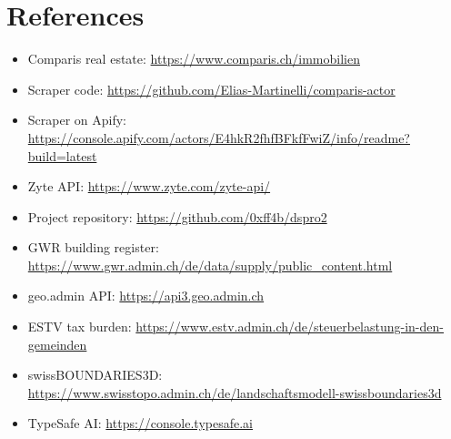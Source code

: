 \documentclass[11pt, a4paper]{article}
\begin{document}
\section{References}
\begin{itemize}
    \item Comparis real estate: \url{https://www.comparis.ch/immobilien}
    \item Scraper code: \url{https://github.com/Elias-Martinelli/comparis-actor}
    \item Scraper on Apify: \url{https://console.apify.com/actors/E4hkR2fhfBFkfFwiZ/info/readme?build=latest}
    \item Zyte API: \url{https://www.zyte.com/zyte-api/}
    \item Project repository: \url{https://github.com/0xff4b/dspro2}
    \item GWR building register: \url{https://www.gwr.admin.ch/de/data/supply/public_content.html}
    \item geo.admin API: \url{https://api3.geo.admin.ch}
    \item ESTV tax burden: \url{https://www.estv.admin.ch/de/steuerbelastung-in-den-gemeinden}
    \item swissBOUNDARIES3D: \url{https://www.swisstopo.admin.ch/de/landschaftsmodell-swissboundaries3d}
    \item TypeSafe AI: \url{https://console.typesafe.ai}
\end{itemize}
\end{document}
